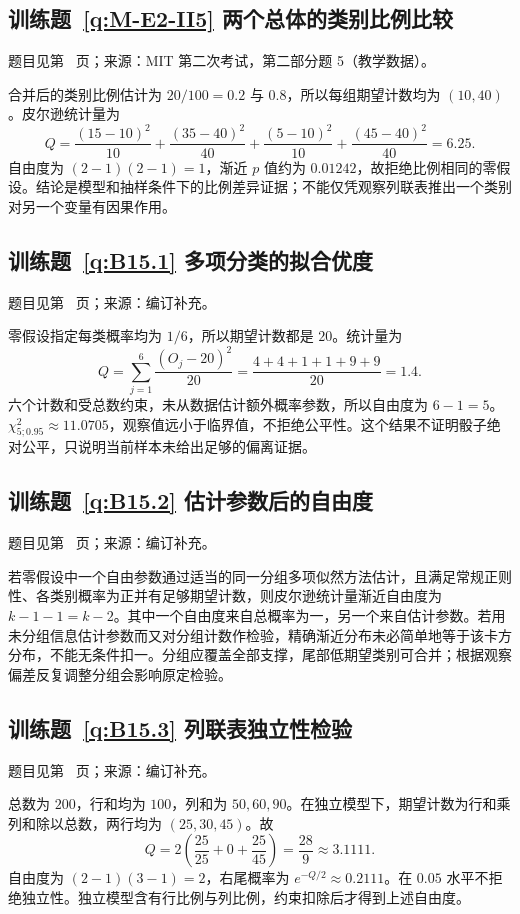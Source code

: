 \subsection*{训练题~\ref{q:M-E2-II5} 两个总体的类别比例比较}\label{a:M-E2-II5}{\small 题目见第~\pageref{q:M-E2-II5} 页；来源：MIT 第二次考试，第二部分题 5（教学数据）。}
\begin{solve}合并后的类别比例估计为 $20/100=0.2$ 与 $0.8$，所以每组期望计数均为 $(10,40)$。皮尔逊统计量为\[Q=\frac{(15-10)^2}{10}+\frac{(35-40)^2}{40}+\frac{(5-10)^2}{10}+\frac{(45-40)^2}{40}=6.25.\]自由度为 $(2-1)(2-1)=1$，渐近 $p$ 值约为 $0.01242$，故拒绝比例相同的零假设。结论是模型和抽样条件下的比例差异证据；不能仅凭观察列联表推出一个类别对另一个变量有因果作用。\end{solve}

\subsection*{训练题~\ref{q:B15.1} 多项分类的拟合优度}\label{a:B15.1}{\small 题目见第~\pageref{q:B15.1} 页；来源：编订补充。}
\begin{solve}零假设指定每类概率均为 $1/6$，所以期望计数都是 $20$。统计量为\[Q=\sum_{j=1}^6\frac{(O_j-20)^2}{20}=\frac{4+4+1+1+9+9}{20}=1.4.\]六个计数和受总数约束，未从数据估计额外概率参数，所以自由度为 $6-1=5$。$\chi^2_{5;0.95}\approx11.0705$，观察值远小于临界值，不拒绝公平性。这个结果不证明骰子绝对公平，只说明当前样本未给出足够的偏离证据。\end{solve}

\subsection*{训练题~\ref{q:B15.2} 估计参数后的自由度}\label{a:B15.2}{\small 题目见第~\pageref{q:B15.2} 页；来源：编订补充。}
\begin{solve}若零假设中一个自由参数通过适当的同一分组多项似然方法估计，且满足常规正则性、各类别概率为正并有足够期望计数，则皮尔逊统计量渐近自由度为 $k-1-1=k-2$。其中一个自由度来自总概率为一，另一个来自估计参数。若用未分组信息估计参数而又对分组计数作检验，精确渐近分布未必简单地等于该卡方分布，不能无条件扣一。分组应覆盖全部支撑，尾部低期望类别可合并；根据观察偏差反复调整分组会影响原定检验。\end{solve}

\subsection*{训练题~\ref{q:B15.3} 列联表独立性检验}\label{a:B15.3}{\small 题目见第~\pageref{q:B15.3} 页；来源：编订补充。}
\begin{solve}总数为 $200$，行和均为 $100$，列和为 $50,60,90$。在独立模型下，期望计数为行和乘列和除以总数，两行均为 $(25,30,45)$。故\[Q=2\left(\frac{25}{25}+0+\frac{25}{45}\right)=\frac{28}{9}\approx3.1111.\]自由度为 $(2-1)(3-1)=2$，右尾概率为 $e^{-Q/2}\approx0.2111$。在 $0.05$ 水平不拒绝独立性。独立模型含有行比例与列比例，约束扣除后才得到上述自由度。\end{solve}

